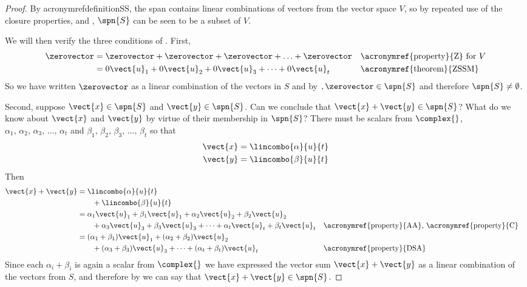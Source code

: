 \begin{proof}
By acronymref{definition}{SS}, the span contains linear combinations of vectors from the vector space $V$, so by repeated use of the closure properties,  and , $\spn{S}$ can be seen to be a subset of $V$.\par
%
We will then verify the three conditions of .  First,
%
\begin{align*}
\zerovector
&=\zerovector+\zerovector+\zerovector+\ldots+\zerovector&&\text{\acronymref{property}{Z} for $V$}\\
&=0\vect{u}_1+0\vect{u}_2+0\vect{u}_3+\cdots+0\vect{u}_t&&\text{\acronymref{theorem}{ZSSM}}
\end{align*}
%
So we have written $\zerovector$ as a linear combination of the vectors in $S$ and by $, \zerovector\in\spn{S}$ and therefore $\spn{S}\neq\emptyset$.\par
%
Second, suppose $\vect{x}\in\spn{S}$ and $\vect{y}\in\spn{S}$.  Can we conclude that $\vect{x}+\vect{y}\in\spn{S}$?  What do we know about $\vect{x}$ and $\vect{y}$ by virtue of their membership in $\spn{S}$?  There must be scalars from $\complex{\null}$,
$\alpha_1,\,\alpha_2,\,\alpha_3,\,\ldots,\,\alpha_t$ and
$\beta_1,\,\beta_2,\,\beta_3,\,\ldots,\,\beta_t$ so that
%
\begin{align*}
\vect{x}&=\lincombo{\alpha}{u}{t}\\
\vect{y}&=\lincombo{\beta}{u}{t}
\end{align*}
%
Then
%
\begin{align*}
\vect{x}+\vect{y}&=\lincombo{\alpha}{u}{t}\\
&\quad\quad+\lincombo{\beta}{u}{t}\\
&=\alpha_1\vect{u}_1+\beta_1\vect{u}_1+\alpha_2\vect{u}_2+\beta_2\vect{u}_2\\
&\quad\quad+\alpha_3\vect{u}_3+\beta_3\vect{u}_3+\cdots+\alpha_t\vect{u}_t+\beta_t\vect{u}_t&&\text{\acronymref{property}{AA}, \acronymref{property}{C}}\\
&=(\alpha_1+\beta_1)\vect{u}_1+(\alpha_2+\beta_2)\vect{u}_2\\
&\quad\quad+(\alpha_3+\beta_3)\vect{u}_3+\cdots+(\alpha_t+\beta_t)\vect{u}_t&&\text{\acronymref{property}{DSA}}
\end{align*}
%
Since each $\alpha_i+\beta_i$ is again a scalar from $\complex{\null}$ we have expressed the vector sum $\vect{x}+\vect{y}$ as a linear combination of the vectors from $S$, and therefore by  we can say that $\vect{x}+\vect{y}\in\spn{S}$.\par

\end{proof}
